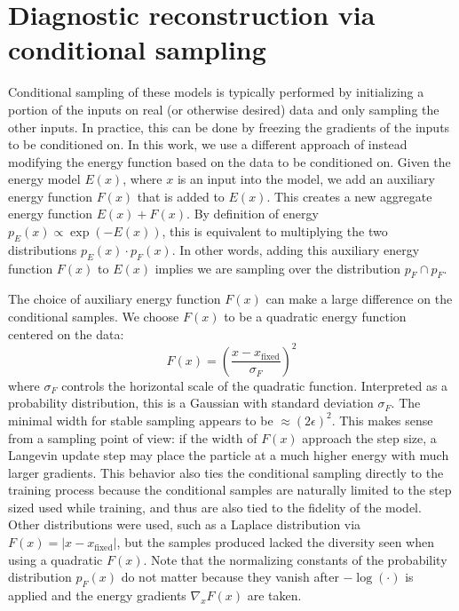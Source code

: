 
\section{Diagnostic reconstruction via conditional sampling}

Conditional sampling of these models is typically performed by initializing a portion of the inputs on real (or otherwise desired) data and only sampling the other inputs. In practice, this can be done by freezing the gradients of the inputs to be conditioned on. In this work, we use a different approach of instead modifying the energy function based on the data to be conditioned on. Given the energy model $E(x)$, where $x$ is an input into the model, we add an auxiliary energy function $F(x)$ that is added to $E(x)$. This creates a new aggregate energy function $E(x) + F(x)$. By definition of energy $p_E(x) \propto \exp(-E(x))$, this is equivalent to multiplying the two distributions $p_E(x) \cdot p_F(x)$. In other words, adding this auxiliary energy function $F(x)$ to $E(x)$ implies we are sampling over the distribution $p_F \cap p_F$.

The choice of auxiliary energy function $F(x)$ can make a large difference on the conditional samples. We choose $F(x)$ to be a quadratic energy function centered on the data: 
\begin{equation}
	F(x) = \left(\frac{x - x_\text{fixed}}{\sigma_F} \right)^2
\end{equation}
where $\sigma_F$ controls the horizontal scale of the quadratic function. Interpreted as a probability distribution, this is a Gaussian with standard deviation $\sigma_F$. The minimal width for stable sampling appears to be $\approx (2 \epsilon)^2$. This makes sense from a sampling point of view: if the width of $F(x)$ approach the step size, a Langevin update step may place the particle at a much higher energy with much larger gradients. This behavior also ties the conditional sampling directly to the training process because the conditional samples are naturally limited to the step sized used while training, and thus are also tied to the fidelity of the model. Other distributions were used, such as a Laplace distribution via $F(x) = \vert x - x_\text{fixed} \vert$, but the samples produced lacked the diversity seen when using a quadratic $F(x)$. Note that the normalizing constants of the probability distribution $p_F(x)$ do not matter because they vanish after $-\log(\cdot)$ is applied and the energy gradients $\nabla_x F(x)$ are taken.

